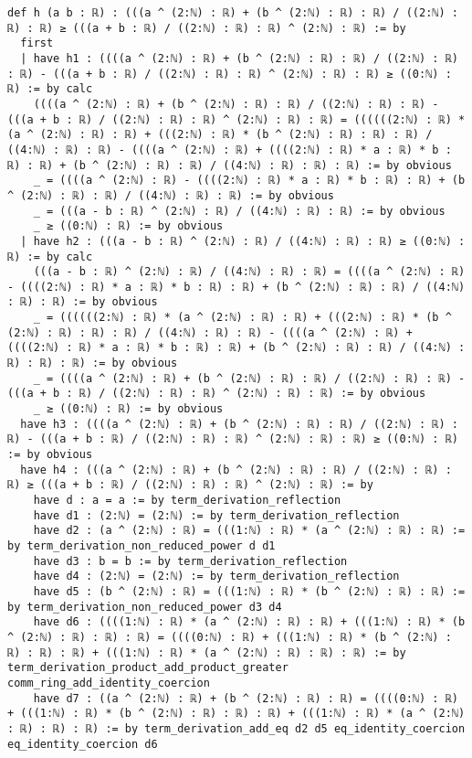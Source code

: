 \documentclass{article}
\begin{document}
\begin{tcolorbox}[colback=white!10, width=\linewidth]
\begin{lstlisting}[language=Lean4]
def h (a b : ℝ) : (((a ^ (2:ℕ) : ℝ) + (b ^ (2:ℕ) : ℝ) : ℝ) / ((2:ℕ) : ℝ) : ℝ) ≥ (((a + b : ℝ) / ((2:ℕ) : ℝ) : ℝ) ^ (2:ℕ) : ℝ) := by
  first
  | have h1 : ((((a ^ (2:ℕ) : ℝ) + (b ^ (2:ℕ) : ℝ) : ℝ) / ((2:ℕ) : ℝ) : ℝ) - (((a + b : ℝ) / ((2:ℕ) : ℝ) : ℝ) ^ (2:ℕ) : ℝ) : ℝ) ≥ ((0:ℕ) : ℝ) := by calc
    ((((a ^ (2:ℕ) : ℝ) + (b ^ (2:ℕ) : ℝ) : ℝ) / ((2:ℕ) : ℝ) : ℝ) - (((a + b : ℝ) / ((2:ℕ) : ℝ) : ℝ) ^ (2:ℕ) : ℝ) : ℝ) = ((((((2:ℕ) : ℝ) * (a ^ (2:ℕ) : ℝ) : ℝ) + (((2:ℕ) : ℝ) * (b ^ (2:ℕ) : ℝ) : ℝ) : ℝ) / ((4:ℕ) : ℝ) : ℝ) - ((((a ^ (2:ℕ) : ℝ) + ((((2:ℕ) : ℝ) * a : ℝ) * b : ℝ) : ℝ) + (b ^ (2:ℕ) : ℝ) : ℝ) / ((4:ℕ) : ℝ) : ℝ) : ℝ) := by obvious
    _ = ((((a ^ (2:ℕ) : ℝ) - ((((2:ℕ) : ℝ) * a : ℝ) * b : ℝ) : ℝ) + (b ^ (2:ℕ) : ℝ) : ℝ) / ((4:ℕ) : ℝ) : ℝ) := by obvious
    _ = (((a - b : ℝ) ^ (2:ℕ) : ℝ) / ((4:ℕ) : ℝ) : ℝ) := by obvious
    _ ≥ ((0:ℕ) : ℝ) := by obvious
  | have h2 : (((a - b : ℝ) ^ (2:ℕ) : ℝ) / ((4:ℕ) : ℝ) : ℝ) ≥ ((0:ℕ) : ℝ) := by calc
    (((a - b : ℝ) ^ (2:ℕ) : ℝ) / ((4:ℕ) : ℝ) : ℝ) = ((((a ^ (2:ℕ) : ℝ) - ((((2:ℕ) : ℝ) * a : ℝ) * b : ℝ) : ℝ) + (b ^ (2:ℕ) : ℝ) : ℝ) / ((4:ℕ) : ℝ) : ℝ) := by obvious
    _ = ((((((2:ℕ) : ℝ) * (a ^ (2:ℕ) : ℝ) : ℝ) + (((2:ℕ) : ℝ) * (b ^ (2:ℕ) : ℝ) : ℝ) : ℝ) / ((4:ℕ) : ℝ) : ℝ) - ((((a ^ (2:ℕ) : ℝ) + ((((2:ℕ) : ℝ) * a : ℝ) * b : ℝ) : ℝ) + (b ^ (2:ℕ) : ℝ) : ℝ) / ((4:ℕ) : ℝ) : ℝ) : ℝ) := by obvious
    _ = ((((a ^ (2:ℕ) : ℝ) + (b ^ (2:ℕ) : ℝ) : ℝ) / ((2:ℕ) : ℝ) : ℝ) - (((a + b : ℝ) / ((2:ℕ) : ℝ) : ℝ) ^ (2:ℕ) : ℝ) : ℝ) := by obvious
    _ ≥ ((0:ℕ) : ℝ) := by obvious
  have h3 : ((((a ^ (2:ℕ) : ℝ) + (b ^ (2:ℕ) : ℝ) : ℝ) / ((2:ℕ) : ℝ) : ℝ) - (((a + b : ℝ) / ((2:ℕ) : ℝ) : ℝ) ^ (2:ℕ) : ℝ) : ℝ) ≥ ((0:ℕ) : ℝ) := by obvious
  have h4 : (((a ^ (2:ℕ) : ℝ) + (b ^ (2:ℕ) : ℝ) : ℝ) / ((2:ℕ) : ℝ) : ℝ) ≥ (((a + b : ℝ) / ((2:ℕ) : ℝ) : ℝ) ^ (2:ℕ) : ℝ) := by
    have d : a = a := by term_derivation_reflection
    have d1 : (2:ℕ) = (2:ℕ) := by term_derivation_reflection
    have d2 : (a ^ (2:ℕ) : ℝ) = (((1:ℕ) : ℝ) * (a ^ (2:ℕ) : ℝ) : ℝ) := by term_derivation_non_reduced_power d d1
    have d3 : b = b := by term_derivation_reflection
    have d4 : (2:ℕ) = (2:ℕ) := by term_derivation_reflection
    have d5 : (b ^ (2:ℕ) : ℝ) = (((1:ℕ) : ℝ) * (b ^ (2:ℕ) : ℝ) : ℝ) := by term_derivation_non_reduced_power d3 d4
    have d6 : ((((1:ℕ) : ℝ) * (a ^ (2:ℕ) : ℝ) : ℝ) + (((1:ℕ) : ℝ) * (b ^ (2:ℕ) : ℝ) : ℝ) : ℝ) = ((((0:ℕ) : ℝ) + (((1:ℕ) : ℝ) * (b ^ (2:ℕ) : ℝ) : ℝ) : ℝ) + (((1:ℕ) : ℝ) * (a ^ (2:ℕ) : ℝ) : ℝ) : ℝ) := by term_derivation_product_add_product_greater comm_ring_add_identity_coercion
    have d7 : ((a ^ (2:ℕ) : ℝ) + (b ^ (2:ℕ) : ℝ) : ℝ) = ((((0:ℕ) : ℝ) + (((1:ℕ) : ℝ) * (b ^ (2:ℕ) : ℝ) : ℝ) : ℝ) + (((1:ℕ) : ℝ) * (a ^ (2:ℕ) : ℝ) : ℝ) : ℝ) := by term_derivation_add_eq d2 d5 eq_identity_coercion eq_identity_coercion d6

\end{lstlisting}
\end{tcolorbox}
\end{document}
